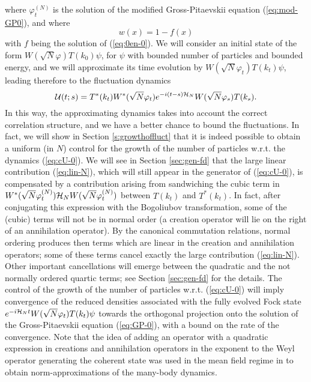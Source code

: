 \documentclass[11pt,a4paper]{article}
\newcommand{\cU}{{\cal U}}
\newcommand{\cH}{{\cal H}}
\begin{document}
where $\varphi^{(N)}_t$ is the solution of the modified Gross-Pitaevskii equation (\ref{eq:mod-GP0}), and where
\[ w (x) = 1 - f(x) \]
with $f$ being the solution of (\ref{eq:0en-0}). We will consider an initial state of the form $W(\sqrt{N} \varphi) T(k_0) \psi$, for $\psi$ with bounded number of particles and bounded energy, and we will approximate its time evolution by $W(\sqrt{N} \varphi_t) T(k_t) \psi$, leading therefore to the fluctuation dynamics 
\begin{equation}\label{eq:cU-0} \cU (t;s) = T^* (k_t) W^* (\sqrt{N}
\varphi_t) e^{-i(t-s) \cH_N} W(\sqrt{N} \varphi_s) T(k_s). \end{equation}
In this way, the approximating dynamics takes into account the correct correlation structure, and we have a better chance to bound the fluctuations. In fact, we will show in Section \ref{s:growthoffluct} that it is indeed possible to obtain a uniform (in $N$) control for the growth of the number of particles w.r.t. the dynamics (\ref{eq:cU-0}). We will see in Section \ref{sec:gen-fd} that the large linear contribution (\ref{eq:lin-N}), which will still appear in the generator of (\ref{eq:cU-0}), is compensated by a contribution arising from sandwiching the cubic term in $W^* (\sqrt{N} \varphi_t^{(N)}) \cH_N W(\sqrt{N} \varphi_t^{(N)})$ between $T(k_t)$ and $T^* (k_t)$. In fact, after conjugating this expression with the Bogoliubov transformation, some of the (cubic) terms will not be in normal order (a creation operator will lie on the right of an annihilation operator). By the canonical commutation relations, normal ordering produces then terms which are linear in the creation and annihilation operators; some of these terms cancel exactly the large contribution (\ref{eq:lin-N}). Other important cancellations will emerge between the quadratic and the not normally ordered quartic terms; see Section \ref{sec:gen-fd} for the details. The control of the growth of the number of particles w.r.t. (\ref{eq:cU-0}) will imply convergence of the reduced densities associated with the fully evolved Fock state $e^{-i \cH_N t} W(\sqrt{N} \varphi_t) T(k_t) \psi$ towards the orthogonal projection onto the solution of the Gross-Pitaevskii equation (\ref{eq:GP-0}), with a bound on the rate of the convergence. Note that the idea of adding an operator with a quadratic expression in creations and annihilation operators in the exponent to the Weyl operator generating the coherent state was used in the mean field regime in \cite{GMM2010} to obtain norm-approximations of the many-body dynamics. 
\end{document}
